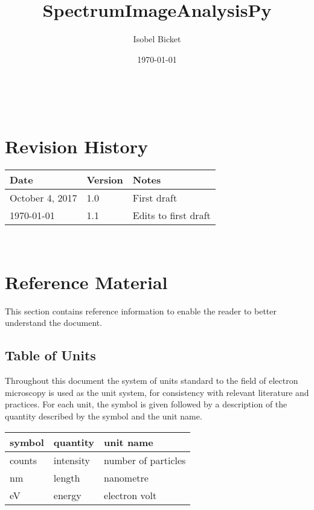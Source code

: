 \documentclass[12pt]{article}
\begin{document}
\label{doc:SRS}

\title{SpectrumImageAnalysisPy} 
\author{Isobel Bicket}
\date{\today}
	
\maketitle

~\newpage



\section{Revision History}

\begin{tabularx}{\textwidth}{p{4cm}p{2cm}X}
	\toprule {\bf Date} & {\bf Version} & {\bf Notes}\\
	\midrule
	October 4, 2017  & 1.0 & First draft\\
	\today & 1.1 & Edits to first draft\\
	\bottomrule
\end{tabularx}

~\newpage

\tableofcontents

\section{Reference Material}
\label{SRS:RefMat}

This section contains reference information to enable the reader to better
understand the document.

\subsection{Table of Units}
\label{TableUnits}

Throughout this document the system of units standard to the field of electron
microscopy is used
as the unit system, for consistency with relevant literature and practices. For
each unit, the symbol is given followed by a
description of the quantity described by the symbol and the unit name.
~\newline

\renewcommand{\arraystretch}{1.2}
  \noindent \begin{tabular}{l l l} 
    \toprule		
    \textbf{symbol} & \textbf{quantity} & \textbf{unit name}\\
    \midrule 
    counts & intensity & number of particles\\
    \si{\nano\metre} & length & nanometre\\
    \si{\electronvolt} & energy	& electron volt\\
    \bottomrule
  \end{tabular}
\end{document}
